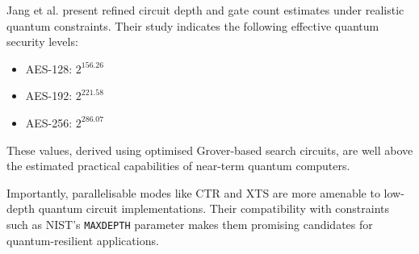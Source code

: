 Jang et al.\cite{Jang2025} present refined circuit depth and gate count estimates under realistic quantum constraints. 
Their study indicates the following effective quantum security levels:

\begin{itemize}
    \item AES-128: $2^{156.26}$
    \item AES-192: $2^{221.58}$
    \item AES-256: $2^{286.07}$
\end{itemize} 

These values, derived using optimised Grover-based search circuits, 
are well above the estimated practical capabilities of near-term quantum computers\cite{Jang2025}. \newline

Importantly, parallelisable modes like CTR and XTS are more amenable to low-depth quantum circuit implementations. 
Their compatibility with constraints such as NIST’s \texttt{MAXDEPTH} parameter makes them promising candidates for quantum-resilient applications\cite{Jang2025}.

\begin{table}[h]
\centering
{}
\caption{Security characteristics of AES modes of operation.}
\end{table}